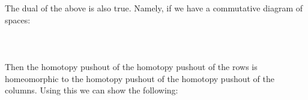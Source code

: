 The dual of the above is also true. Namely, if we have a commutative diagram of spaces:  
 \\~\\  \\~\\
Then the homotopy pushout of the homotopy pushout of the rows is homeomorphic to the homotopy pushout of the homotopy pushout of the columns. Using this we can show the following: 

